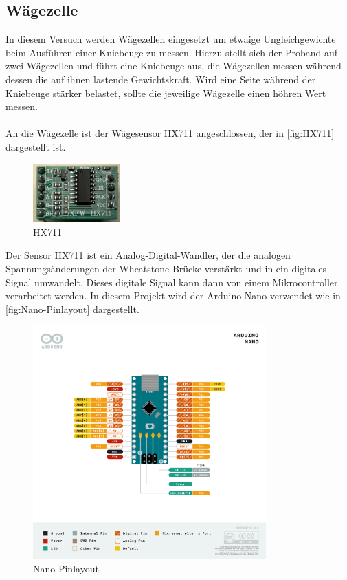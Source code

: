 \subsection{Wägezelle}
In diesem Versuch werden Wägezellen eingesetzt um etwaige Ungleichgewichte beim Ausführen einer Kniebeuge zu messen.
Hierzu stellt sich der Proband auf zwei Wägezellen und führt eine Kniebeuge aus, die Wägezellen messen während dessen die auf ihnen lastende Gewichtskraft.
Wird eine Seite während der Kniebeuge stärker belastet, sollte die jeweilige Wägezelle einen höhren Wert messen. \\ \\
An die Wägezelle ist der Wägesensor HX711 angeschlossen, der in \autoref{fig:HX711} dargestellt ist.
\begin{figure}[h!]
    \centering
    \includegraphics[width=0.3\textwidth]{img/HX711.png}
    \caption{HX711 \cite{prilchen}}
    \label{fig:HX711}
\end{figure}
Der Sensor HX711 ist ein Analog-Digital-Wandler, der die analogen Spannungsänderungen der Wheatstone-Brücke verstärkt und in ein digitales Signal umwandelt.
Dieses digitale Signal kann dann von einem Mikrocontroller verarbeitet werden.
In diesem Projekt wird der Arduino Nano verwendet wie in \autoref{fig:Nano-Pinlayout} dargestellt.
\begin{figure}[h!]
    \centering
    \includegraphics[width=0.8\textwidth]{img/Nano-Pinlayout.png}
    \caption{Nano-Pinlayout \cite{Arduino}}
    \label{fig:Nano-Pinlayout}
\end{figure}
